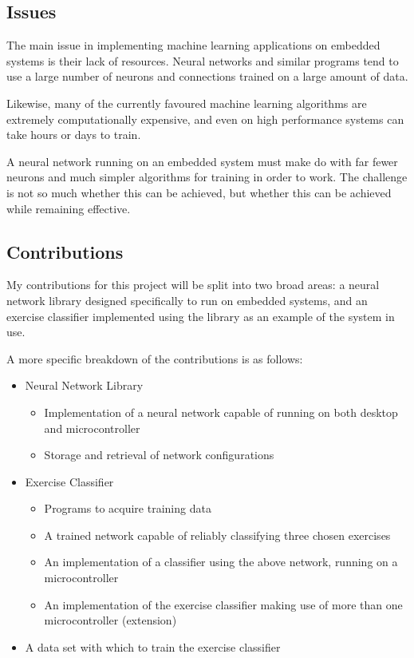 \documentclass[a4paper]{article}
\begin{document}
\subsection{Issues}%
\label{subsec:in_issues}

The main issue in implementing machine learning applications on embedded systems is their lack of resources. Neural networks and similar programs tend to use a large number of neurons and connections trained on a large amount of data.

Likewise, many of the currently favoured machine learning algorithms are extremely computationally expensive, and even on high performance systems can take hours or days to train.

A neural network running on an embedded system must make do with far fewer neurons and much simpler algorithms for training in order to work. The challenge is not so much whether this can be achieved, but whether this can be achieved while remaining effective.

\subsection{Contributions}%
\label{subsec:in_cs}

My contributions for this project will be split into two broad areas: a neural network library designed specifically to run on embedded systems, and an exercise classifier implemented using the library as an example of the system in use.

A more specific breakdown of the contributions is as follows:

\begin{itemize}
\item Neural Network Library 
  \begin{itemize}
  \item Implementation of a neural network capable of running on  both desktop and microcontroller
    \item Storage and retrieval of network configurations
  \end{itemize}
\item Exercise Classifier
  \begin{itemize}
  \item Programs to acquire training data
    \item A trained network capable of reliably classifying three chosen exercises
    \item An implementation of a classifier using the above network, running on a microcontroller
    \item An implementation of the exercise classifier making use of more than one microcontroller (extension)
  \end{itemize}
\item A data set with which to train the exercise classifier
\end{itemize}
\end{document}
